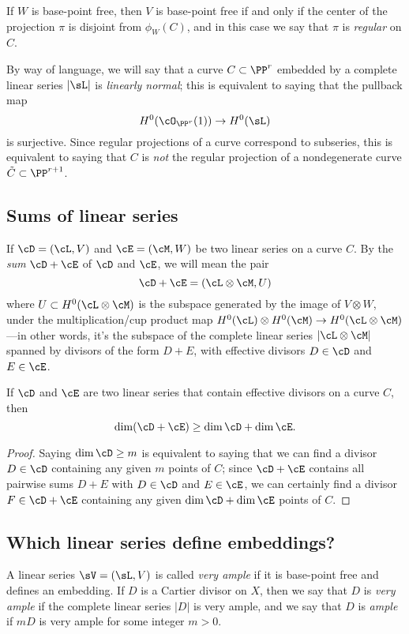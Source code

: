 If $W$ is base-point free, then $V$ is base-point free if and only if the center of the projection $\pi$ is disjoint from $\phi_W(C)$, and in this case we say that $\pi$ is \emph{regular} on $C$.

By way of language, we will say that a curve $C \subset \PP^r$ embedded by a complete linear series $|\sL|$ is \emph{linearly normal}; this is equivalent to saying that the pullback map
$$
H^0(\cO_{\PP^r}(1)) \to H^0(\sL)
$$
is surjective. Since regular projections of a curve correspond to subseries, this is equivalent to saying that $C$ is \emph{not} the regular  projection of a nondegenerate curve $\tilde C \subset \PP^{r+1}$. 

\subsection{Sums of linear series}
If
$\cD = (\cL,V)$ and $\cE = (\cM, W)$ be two linear series on a curve $C$. By the \emph{sum} $\cD + \cE$ of $\cD$ and $\cE$, we will mean the pair 
$$
\cD + \cE = (\cL \otimes \cM, U) 
$$
where $U \subset H^0(\cL \otimes \cM)$ is the subspace generated by the image of $V \otimes W$, under the multiplication/cup product map $H^0(\cL) \otimes H^0(\cM) \to H^0(\cL \otimes \cM)$---in other words, it's the subspace of the complete linear series $|\cL\otimes \cM|$ spanned by divisors of the form $D+E$, with effective divisors $D \in \cD$ and $E \in \cE$.
 
 
\begin{proposition}\label{sum of linear series}
 If $\cD$ and $\cE$ are two  linear series that contain effective divisors on a curve $C$, then
$$
\dim(\cD + \cE) \geq \dim \cD + \dim \cE.
$$
\end{proposition}
\begin{proof}
Saying $\dim \cD \geq m$ is equivalent to saying that we can find a divisor $D \in \cD$ containing any given $m$ points of $C$; since $\cD + \cE$ contains all pairwise sums $D + E$ with $D \in \cD$ and $E \in \cE$, we can certainly find a divisor $F \in \cD + \cE$ containing any given $\dim \cD + \dim \cE$ points of $C$.
\end{proof}

\subsection{Which linear series define embeddings?}

A linear series $\sV = (\sL, V)$ is called  \emph{very ample}  if it is base-point free and defines an embedding. If $D$ is a Cartier divisor on $X$, then we say that $D$ is \emph{very ample} if the complete linear series $|D|$ is very ample, and we say that $D$ is \emph{ample} if $mD$ is very ample for some integer $m>0$.

